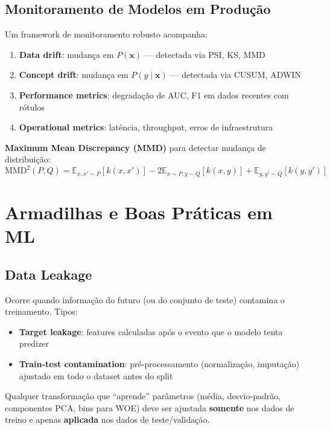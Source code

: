\documentclass[12pt,a4paper,twoside]{book}
\theoremstyle{definition}
\theoremstyle{remark}
\newcommand{\E}{\mathbb{E}}
\newcommand{\bx}{\bm{x}}
\begin{document}
\section{Monitoramento de Modelos em Produção}

Um framework de monitoramento robusto acompanha:

\begin{enumerate}
  \item \textbf{Data drift}: mudança em $P(\bx)$ — detectada via PSI, KS, MMD
  \item \textbf{Concept drift}: mudança em $P(y \mid \bx)$ — detectada via CUSUM, ADWIN
  \item \textbf{Performance metrics}: degradação de AUC, F1 em dados recentes com rótulos
  \item \textbf{Operational metrics}: latência, throughput, erros de infraestrutura
\end{enumerate}

\textbf{Maximum Mean Discrepancy (MMD)} para detectar mudança de distribuição:
\[
\mathrm{MMD}^2(P,Q) = \E_{x,x'\sim P}[k(x,x')] - 2\E_{x\sim P,y\sim Q}[k(x,y)] + \E_{y,y'\sim Q}[k(y,y')]
\]

\chapter{Armadilhas e Boas Práticas em ML}

\section{Data Leakage}

Ocorre quando informação do futuro (ou do conjunto de teste) contamina o treinamento. Tipos:

\begin{itemize}
  \item \textbf{Target leakage}: features calculadas após o evento que o modelo tenta predizer
  \item \textbf{Train-test contamination}: pré-processamento (normalização, imputação) ajustado em todo o dataset antes do split
\end{itemize}

\begin{tcolorbox}[alertbox,title=Regra de Ouro: Sempre use Pipelines]
Qualquer transformação que ``aprende'' parâmetros (média, desvio-padrão, componentes PCA, bins para WOE) deve ser ajustada \textbf{somente} nos dados de treino e apenas \textbf{aplicada} nos dados de teste/validação.
\end{tcolorbox}
\end{document}
